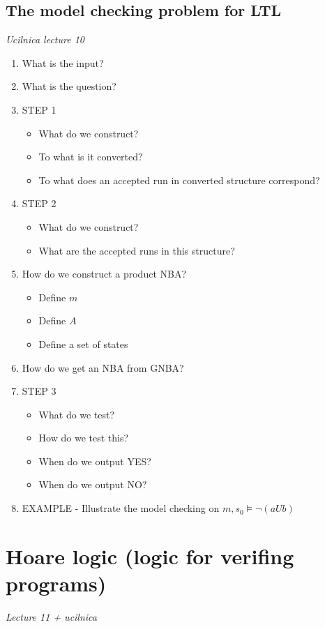 \documentclass[fleqn]{article}
\begin{document}
\subsection{The model checking problem for LTL}
\textit{Ucilnica lecture 10}
\begin{enumerate}
    \item What is the input?
    \item What is the question?
    \item STEP 1
    \begin{itemize}
        \item What do we construct?
        \item To what is it converted?
        \item To what does an accepted run in converted structure correspond?
    \end{itemize}
    \item STEP 2
    \begin{itemize}
        \item What do we construct?
        \item What are the accepted runs in this structure?
    \end{itemize}
    \item How do we construct a product NBA?
    \begin{itemize}
        \item Define $m$
        \item Define $A$
        \item Define a set of states
    \end{itemize}
    \item How do we get an NBA from GNBA? 
    \item STEP 3
    \begin{itemize}
        \item What do we test?
        \item How do we test this?
        \item When do we output YES?
        \item When do we output NO?
    \end{itemize}
    \item EXAMPLE - Illustrate the model checking on $m, s_0 \models \neg (a U b)$
\end{enumerate}


\section{Hoare logic (logic for verifing programs)}
\textit{Lecture 11 + ucilnica}
\end{document}
